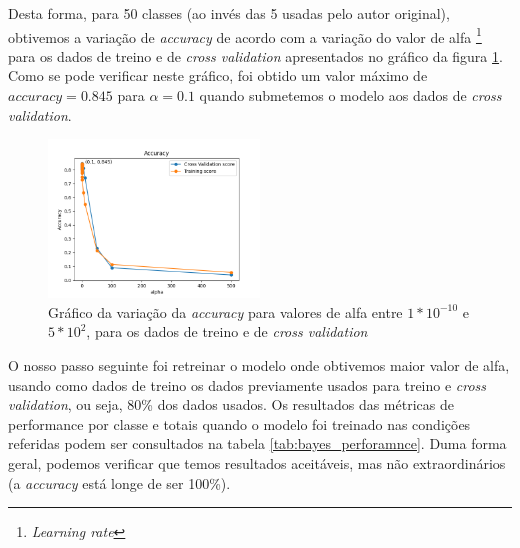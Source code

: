 Desta forma, para 50 classes (ao invés das 5 usadas pelo autor original), obtivemos a variação de \textit{accuracy} de acordo com a variação do valor de alfa \footnote{\textit{Learning rate}} para os dados de treino e de \textit{cross validation} apresentados no gráfico da figura \ref{diagram:accuracy_alfa_bayes}. Como se pode verificar neste gráfico, foi obtido um valor máximo de $accuracy = 0.845$ para $\alpha = 0.1$ quando submetemos o modelo aos dados de \textit{cross validation}. 

\begin{figure}[t]
\begin{center}
\includegraphics[width=0.5\textwidth,keepaspectratio]{figures/accuracy_alpha.png}
\caption{Gráfico da variação da \textit{accuracy} para valores de alfa entre $1*10^{-10}$ e $5*10^{2}$, para os dados de treino e de \textit{cross validation}}
\label{diagram:accuracy_alfa_bayes}
\centering
\end{center}
\end{figure}

O nosso passo seguinte foi retreinar o modelo onde obtivemos maior valor de alfa, usando como dados de treino os dados previamente usados para treino e \textit{cross validation}, ou seja, 80\% dos dados usados. Os resultados das métricas de performance por classe e totais quando o modelo foi treinado nas condições referidas podem ser consultados na tabela \ref{tab:bayes_perforamnce}. Duma forma geral, podemos verificar que temos resultados aceitáveis, mas não extraordinários (a \textit{accuracy} está longe de ser 100\%).

